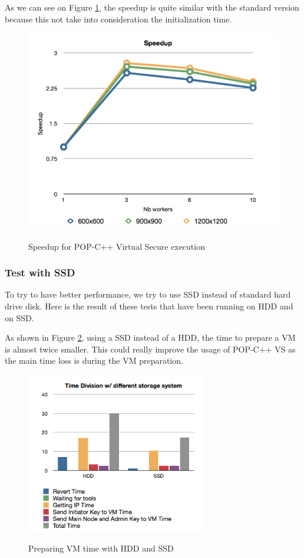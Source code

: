 As we can see on Figure \ref{fig:speedup2}, the speedup is quite similar with the standard version because this not take into consideration the initialization time. 
\begin{figure}[ht]
	\caption{Speedup for POP-C++ Virtual Secure execution}
  	\centering
	\includegraphics[scale=0.7]{./pic/speedup_vs.png}
	\label{fig:speedup2}
\end{figure}
\pagebreak
\subsubsection{Test with SSD}
To try to have better performance, we try to use SSD instead of standard hard drive disk. Here is the result of these tests that have been running on HDD and on SSD. \s

As shown in Figure \ref{fig:ssd_vs_hdd}, using a SSD instead of a HDD, the time to prepare a VM is almost twice smaller. This could really improve the usage of POP-C++ VS as the main time loss is during the VM preparation.
\begin{figure}[ht]
	\caption{Preparing VM time with HDD and SSD}
  	\centering
	\includegraphics[width=0.7\textwidth]{./pic/ssd_vs_hdd.png}
	\label{fig:ssd_vs_hdd}
\end{figure}

